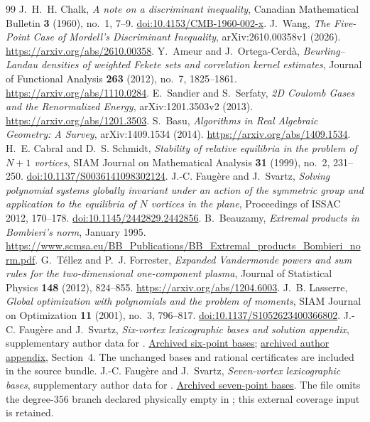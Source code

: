 \documentclass[11pt]{article}
\theoremstyle{remark}
\numberwithin{equation}{section}
\begin{document}
\begin{thebibliography}{99}
\small
\setlength{\itemsep}{2pt}
J.~H.~H. Chalk, \emph{A note on a discriminant inequality},
Canadian Mathematical Bulletin \textbf{3} (1960), no.~1, 7--9.
\href{https://doi.org/10.4153/CMB-1960-002-x}{doi:10.4153/CMB-1960-002-x}.
J.~Wang, \emph{The Five-Point Case of Mordell's Discriminant Inequality},
arXiv:2610.00358v1 (2026). \url{https://arxiv.org/abs/2610.00358}.
Y.~Ameur and J.~Ortega-Cerd\`a,
\emph{Beurling--Landau densities of weighted Fekete sets and correlation
kernel estimates}, Journal of Functional Analysis \textbf{263}
(2012), no.~7, 1825--1861. \url{https://arxiv.org/abs/1110.0284}.
E.~Sandier and S.~Serfaty, \emph{2D Coulomb Gases and the Renormalized
Energy}, arXiv:1201.3503v2 (2013).
\url{https://arxiv.org/abs/1201.3503}.
S.~Basu, \emph{Algorithms in Real Algebraic Geometry: A Survey},
arXiv:1409.1534 (2014). \url{https://arxiv.org/abs/1409.1534}.
H.~E. Cabral and D.~S. Schmidt,
\emph{Stability of relative equilibria in the problem of $N+1$ vortices},
SIAM Journal on Mathematical Analysis \textbf{31} (1999), no.~2, 231--250.
\href{https://doi.org/10.1137/S0036141098302124}{doi:10.1137/S0036141098302124}.
J.-C. Faug\`ere and J.~Svartz,
\emph{Solving polynomial systems globally invariant under an action of
the symmetric group and application to the equilibria of $N$ vortices
in the plane}, Proceedings of ISSAC 2012, 170--178.
\href{https://doi.org/10.1145/2442829.2442856}{doi:10.1145/2442829.2442856}.
B.~Beauzamy, \emph{Extremal products in Bombieri's norm},
January 1995.
\url{https://www.scmsa.eu/BB_Publications/BB_Extremal_products_Bombieri_norm.pdf}.
G.~T\'ellez and P.~J. Forrester,
\emph{Expanded Vandermonde powers and sum rules for the
two-dimensional one-component plasma}, Journal of Statistical Physics
\textbf{148} (2012), 824--855.
\url{https://arxiv.org/abs/1204.6003}.
J.~B. Lasserre, \emph{Global optimization with polynomials and the
problem of moments}, SIAM Journal on Optimization \textbf{11}
(2001), no.~3, 796--817.
\href{https://doi.org/10.1137/S1052623400366802}{doi:10.1137/S1052623400366802}.
J.-C. Faug\`ere and J.~Svartz, \emph{Six-vortex lexicographic bases
and solution appendix}, supplementary author data for \cite{FS}.
\href{https://web.archive.org/web/20240423101624id_/https://www-polsys.lip6.fr/~jcf/vortices/vortices_N6.txt}{Archived six-point bases};
\href{https://web.archive.org/web/20220305130108id_/https://www-polsys.lip6.fr/~jcf/vortices/SOLUTIONS\%20N7.pdf}{archived author appendix}, Section~4.
The unchanged bases and rational certificates are included in the source bundle.
J.-C. Faug\`ere and J.~Svartz, \emph{Seven-vortex lexicographic bases},
supplementary author data for \cite{FS}.
\href{https://web.archive.org/web/20240423101625id_/https://www-polsys.lip6.fr/~jcf/vortices/vortices_N7.txt}{Archived seven-point bases}.
The file omits the degree-$356$ branch declared physically empty in
\cite[Section 7, Figure 4]{FS}; this external coverage input is retained.
\end{thebibliography}
\end{document}
